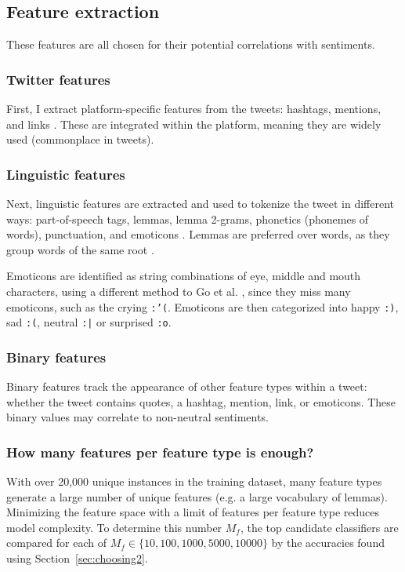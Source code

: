 \documentclass[11pt]{article}
\begin{document}
\subsection{Feature extraction}

These features are all chosen for their potential correlations with sentiments.

\subsubsection{{T}witter features}

First, I extract platform-specific features from the tweets: 
hashtags, mentions, and links \cite{go09,robustnoisy10}.
These are integrated within the platform, meaning they are widely used (commonplace in tweets).

\subsubsection{Linguistic features}

Next, linguistic features are extracted and used to tokenize the tweet in different ways: 
part-of-speech tags, lemmas, lemma 2-grams, phonetics (phonemes of words), punctuation, and emoticons \cite{robustnoisy10,nltk,cmudict}.
Lemmas are preferred over words, as they group words of the same root \cite{nltk}.


Emoticons are identified as string combinations of eye, middle and mouth characters, 
using a different method to Go et al. ,
since they miss many emoticons, such as the crying \texttt{:'(}.
Emoticons are then categorized into happy \texttt{:)}, sad \texttt{:(}, neutral \texttt{:|} or surprised \texttt{:o}.

\subsubsection{Binary features}

Binary features track the appearance of other feature types within a tweet: 
whether the tweet contains quotes, a hashtag, mention, link, or emoticons.
These binary values may correlate to non-neutral sentiments.

\subsubsection{How many features per feature type is enough?}

With over 20,000 unique instances in the training dataset, many feature types generate a large number of unique features (e.g. a large vocabulary of lemmas).
Minimizing the feature space with a limit of features per feature type reduces model complexity.
To determine this number $M_f$, the top candidate classifiers are compared for each of $M_f \in \lbrace 10, 100, 1000, 5000, 10000\rbrace$ by the accuracies found using Section~\ref{sec:choosing2}.
\end{document}
